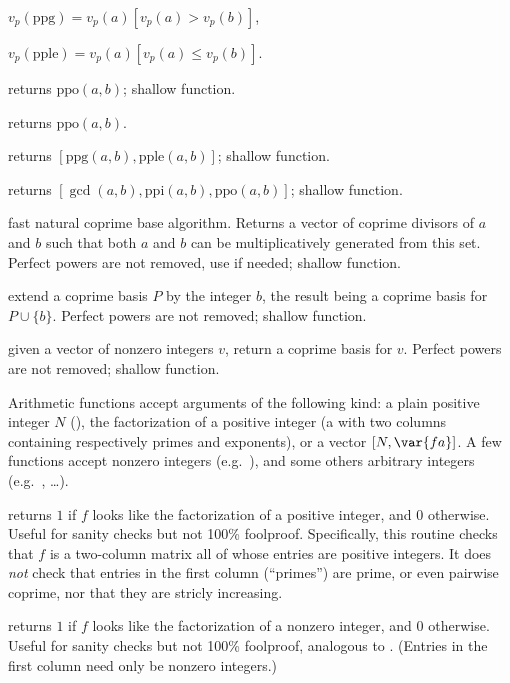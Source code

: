 \item $v_p(\text{ppg}) = v_p(a) [v_p(a) > v_p(b)]$,

\item $v_p(\text{pple}) = v_p(a) [v_p(a) \leq v_p(b)]$.

 returns $\text{ppo}(a,b)$; shallow function.

 returns $\text{ppo}(a,b)$.

 returns $[\text{ppg}(a,b), \text{pple}(a,b)]$;
shallow function.

 returns
$[\gcd(a,b), \text{ppi}(a,b), \text{ppo}(a,b)]$; shallow function.

 fast natural coprime base algorithm. Returns a
vector of coprime divisors of $a$ and $b$ such that both $a$ and $b$ can
be multiplicatively generated from this set. Perfect powers are not removed,
use  if needed; shallow function.

 extend a coprime basis $P$ by the
integer $b$, the result being a coprime basis for $P\cup \{b\}$.
Perfect powers are not removed; shallow function.

 given a vector of nonzero integers $v$, return
a coprime basis for $v$. Perfect powers are not removed; shallow function.


Arithmetic functions accept arguments of the following kind: a plain positive
integer $N$ (), the factorization  of a positive integer (a
 with two columns containing respectively primes and exponents), or
a vector $[N,\var{fa}]$. A few functions accept nonzero
integers (e.g.~), and some others arbitrary integers
(e.g.~, \dots).

 returns $1$ if $f$ looks like the
factorization of a positive integer, and $0$ otherwise. Useful for sanity
checks but not 100\% foolproof. Specifically, this routine checks that $f$ is
a two-column matrix all of whose entries are positive integers. It does
\emph{not} check that entries in the first column (``primes'') are prime,
or even pairwise coprime, nor that they are stricly increasing.

 returns $1$ if $f$ looks like the
factorization of a nonzero integer, and $0$ otherwise. Useful for sanity
checks but not 100\% foolproof, analogous to . (Entries
in the first column need only be nonzero integers.)

